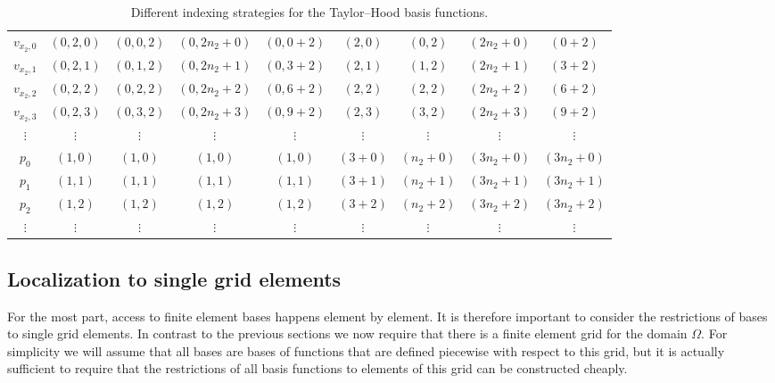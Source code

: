 \documentclass[a4paper,10pt,headings=normal,bibliography=totoc]{scrartcl}
\begin{document}
\begin{table}
\begin{center}
\begin{tabular}{c|c|c|c|c|c|c|c|c}
  \\
  $v_{x_2,0}$
    & $(0,2,0)$
    & $(0,0,2)$
    & $(0,2n_2+0)$
    & $(0,0+2)$
    & $(2,0)$
    & $(0,2)$
    & $(2n_2+0)$
    & $(0+2)$
    \\
  $v_{x_2,1}$
    & $(0,2,1)$
    & $(0,1,2)$
    & $(0,2n_2+1)$
    & $(0,3+2)$
    & $(2,1)$
    & $(1,2)$
    & $(2n_2+1)$
    & $(3+2)$
    \\
  $v_{x_2,2}$
    & $(0,2,2)$
    & $(0,2,2)$
    & $(0,2n_2+2)$
    & $(0,6+2)$
    & $(2,2)$
    & $(2,2)$
    & $(2n_2+2)$
    & $(6+2)$
    \\
  $v_{x_2,3}$
    & $(0,2,3)$
    & $(0,3,2)$
    & $(0,2n_2+3)$
    & $(0,9+2)$
    & $(2,3)$
    & $(3,2)$
    & $(2n_2+3)$
    & $(9+2)$
    \\
  $\vdots$ & $\vdots$ & $\vdots$ & $\vdots$ &  $\vdots$ & $\vdots$ & $\vdots$ & $\vdots$ & $\vdots$
  \\
  $p_{0}$
    & $(1,0)$
    & $(1,0)$
    & $(1,0)$
    & $(1,0)$
    & $(3+0)$
    & $(n_2+0)$
    & $(3n_2+0)$
    & $(3n_2+0)$
    \\
  $p_{1}$
    & $(1,1)$
    & $(1,1)$
    & $(1,1)$
    & $(1,1)$
    & $(3+1)$
    & $(n_2+1)$
    & $(3n_2+1)$
    & $(3n_2+1)$
    \\
  $p_{2}$
    & $(1,2)$
    & $(1,2)$
    & $(1,2)$
    & $(1,2)$
    & $(3+2)$
    & $(n_2+2)$
    & $(3n_2+2)$
    & $(3n_2+2)$
    \\
  $\vdots$ & $\vdots$ & $\vdots$ & $\vdots$ &  $\vdots$ & $\vdots$ & $\vdots$ & $\vdots$ & $\vdots$
  \\
  \hline
\end{tabular}
\end{center}
\caption{Different indexing strategies for the Taylor--Hood basis functions.}
\label{tab:th_indexing_variants}
\end{table}



\subsection{Localization to single grid elements}
\label{sec:localization}

For the most part, access to finite element bases happens element by element.  It is therefore important
to consider the restrictions of bases to single grid elements.  In contrast to the previous sections
we now require that there is a finite element grid for the domain $\Omega$. For simplicity we will
assume that all bases are bases of functions that are defined piecewise with respect to this grid,
but it is actually sufficient to require that the restrictions of all basis functions to elements
of this grid can be constructed cheaply.
\end{document}
